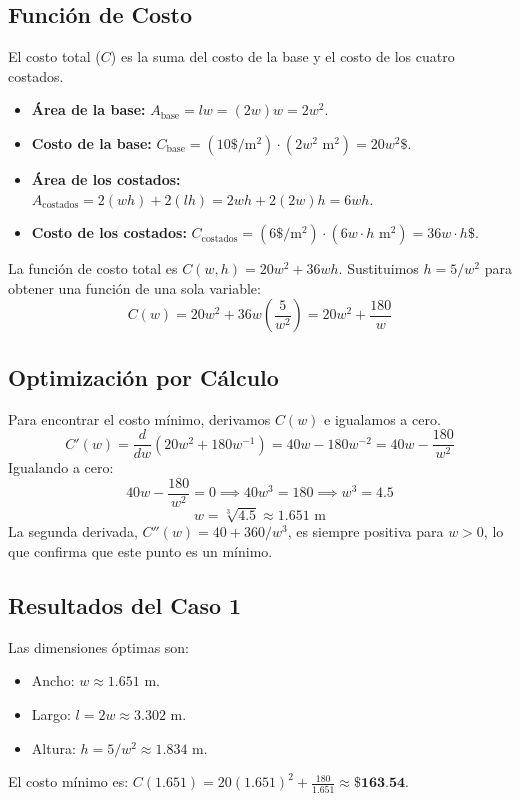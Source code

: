 \documentclass[12pt, letterpaper]{article}
\begin{document}
\subsection*{Función de Costo}
El costo total ($C$) es la suma del costo de la base y el costo de los cuatro costados.
\begin{itemize}
    \item \textbf{Área de la base:} $A_{\text{base}} = lw = (2w)w = 2w^2$.
    \item \textbf{Costo de la base:} $C_{\text{base}} = (10 \$/\text{m}^2) \cdot (2w^2 \text{ m}^2) = 20w^2 \$$.
    \item \textbf{Área de los costados:} $A_{\text{costados}} = 2(wh) + 2(lh) = 2wh + 2(2w)h = 6wh$.
    \item \textbf{Costo de los costados:} $C_{\text{costados}} = (6 \$/\text{m}^2) \cdot (6w \cdot h \text{ m}^2) = 36w \cdot h \$$.
\end{itemize}
La función de costo total es $C(w,h) = 20w^2 + 36wh$. Sustituimos $h = 5/w^2$ para obtener una función de una sola variable:
$$ C(w) = 20w^2 + 36w\left(\frac{5}{w^2}\right) = 20w^2 + \frac{180}{w} $$

\subsection*{Optimización por Cálculo}
Para encontrar el costo mínimo, derivamos $C(w)$ e igualamos a cero.
$$ C'(w) = \frac{d}{dw}\left(20w^2 + 180w^{-1}\right) = 40w - 180w^{-2} = 40w - \frac{180}{w^2} $$
Igualando a cero:
$$ 40w - \frac{180}{w^2} = 0 \implies 40w^3 = 180 \implies w^3 = 4.5 $$
$$ w = \sqrt[3]{4.5} \approx 1.651 \text{ m} $$
La segunda derivada, $C''(w) = 40 + 360/w^3$, es siempre positiva para $w>0$, lo que confirma que este punto es un mínimo.

\subsection*{Resultados del Caso 1}
Las dimensiones óptimas son:
\begin{itemize}
    \item Ancho: $w \approx 1.651$ m.
    \item Largo: $l = 2w \approx 3.302$ m.
    \item Altura: $h = 5/w^2 \approx 1.834$ m.
\end{itemize}
El costo mínimo es: $C(1.651) = 20(1.651)^2 + \frac{180}{1.651} \approx \textbf{\$163.54}$.

\newpage
\end{document}
